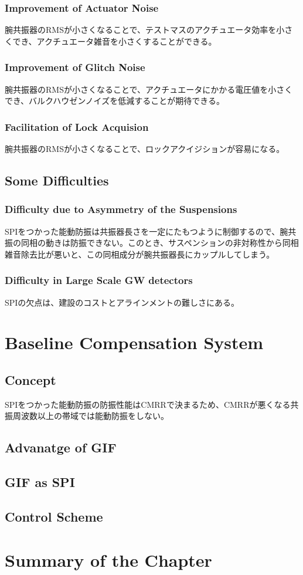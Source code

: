\subsubsection{Improvement of Actuator Noise}
腕共振器のRMSが小さくなることで、テストマスのアクチュエータ効率を小さくでき、アクチュエータ雑音を小さくすることができる。

\subsubsection{Improvement of Glitch Noise}
腕共振器のRMSが小さくなることで、アクチュエータにかかる電圧値を小さくでき、バルクハウゼンノイズを低減することが期待できる。

\cite{manson1972frequency}
\cite{aasi2015characterization}
\cite{cote1991self}

\subsubsection{Facilitation of Lock Acquision}
腕共振器のRMSが小さくなることで、ロックアクイジションが容易になる。

\subsection{Some Difficulties}
\subsubsection{Difficulty due to Asymmetry of the Suspensions}
SPIをつかった能動防振は共振器長さを一定にたもつように制御するので、腕共振の同相の動きは防振できない。このとき、サスペンションの非対称性から同相雑音除去比が悪いと、この同相成分が腕共振器長にカップルしてしまう。

\subsubsection{Difficulty in Large Scale GW detectors}
SPIの欠点は、建設のコストとアラインメントの難しさにある。





%
\section{Baseline Compensation System}\label{sec:52}
\subsection{Concept}
SPIをつかった能動防振の防振性能はCMRRで決まるため、CMRRが悪くなる共振周波数以上の帯域では能動防振をしない。


\subsection{Advanatge of GIF}
\subsection{GIF as SPI}
\subsection{Control Scheme}



\section{Summary of the Chapter}
